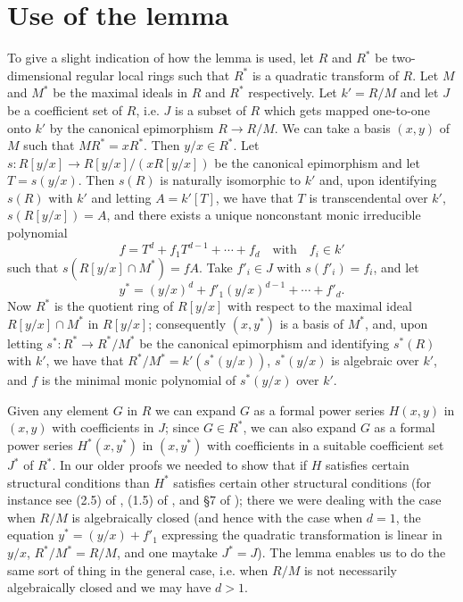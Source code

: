 \section{Use of the lemma}\label{art01-sec3}

To give a slight indication of how the lemma is used, let $R$ and $R^{*}$ be two-dimensional regular local rings such that $R^{*}$ is a quadratic transform of $R$. Let $M$ and $M^{*}$ be the maximal ideals in $R$ and $R^{*}$ respectively. Let $k'=R/M$ and let $J$ be a coefficient set of $R$, i.e. $J$ is a subset of $R$ which gets mapped one-to-one onto $k'$ by the canonical epimorphism $R\to R/M$. We can take a basis $(x,y)$ of $M$ such that $MR^{*}=xR^{*}$. Then $y/x\in R^{*}$. Let $s:R[y/x]\to R[y/x]/(xR[y/x])$ be the canonical epimorphism and let $T=s(y/x)$. Then $s(R)$ is naturally isomorphic to $k'$ and, upon identifying $s(R)$ with $k'$ and letting $A=k'[T]$, we have that $T$ is transcendental over $k'$, $s(R[y/x])=A$, and there exists a unique nonconstant monic irreducible polynomial
$$
f=T^{d}+f_{1}T^{d-1}+\cdots+f_{d}\text{~~ with~~ } f_{i}\in k'
$$
such that $s(R[y/x]\cap M^{*})=fA$. Take $f'_{i}\in J$ with $s(f'_{i})=f_{i}$, and let 
$$
y^{*}=(y/x)^{d}+f'_{1}(y/x)^{d-1}+\cdots+f'_{d}.
$$
Now $R^{*}$ is the quotient ring of $R[y/x]$ with respect to the maximal ideal $R[y/x]\cap M^{*}$ in $R[y/x]$; consequently $(x,y^{*})$ is a basis of $M^{*}$, and, upon letting $s^{*}:R^{*}\to R^{*}/M^{*}$ be the canonical epimorphism and identifying $s^{*}(R)$ with $k'$, we have that $R^{*}/M^{*}=k'(s^{*}(y/x))$, $s^{*}(y/x)$ is algebraic over $k'$, and $f$ is the minimal monic polynomial of $s^{*}(y/x)$ over $k'$.

Given any element $G$ in $R$ we can expand $G$ as a formal power series $H(x,y)$ in $(x,y)$ with coefficients in $J$; since $G\in R^{*}$, we can also expand $G$ as a formal power series $H^{*}(x,y^{*})$ in $(x,y^{*})$ with coefficients in a suitable coefficient set $J^{*}$ of $R^{*}$. In our older proofs we needed to show that if $H$ satisfies certain structural conditions than $H^{*}$ satisfies certain other structural conditions (for instance see (2.5) of \cite{art01-key4}, (1.5) of \cite{art01-key5}, and \S7 of \cite{art01-key11}); there we were dealing with the case when $R/M$ is algebraically closed (and hence with the case when $d=1$, the equation $y^{*}=(y/x)+f'_{1}$ expressing the quadratic transformation is linear in $y/x$, $R^{*}/M^{*}=R/M$, and one may\pageoriginale take $J^{*}=J$). The lemma enables us to do the same sort of thing in the general case, i.e. when $R/M$ is not necessarily algebraically closed and we may have $d>1$.

